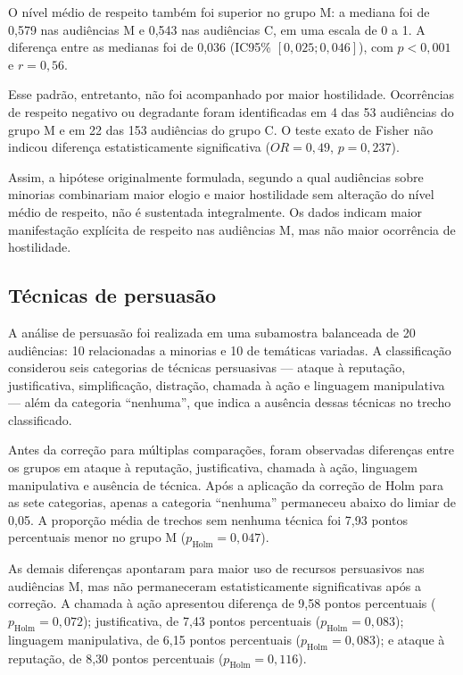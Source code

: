 O nível médio de respeito também foi superior no grupo M: a mediana foi de
0,579 nas audiências M e 0,543 nas audiências C, em uma escala de 0 a 1. A
diferença entre as medianas foi de 0,036 (IC95\% $[0{,}025;0{,}046]$), com
$p<0{,}001$ e $r=0{,}56$.

Esse padrão, entretanto, não foi acompanhado por maior hostilidade. Ocorrências
de respeito negativo ou degradante foram identificadas em 4 das 53 audiências
do grupo M e em 22 das 153 audiências do grupo C. O teste exato de Fisher não
indicou diferença estatisticamente significativa ($OR=0{,}49$, $p=0{,}237$).

Assim, a hipótese originalmente formulada, segundo a qual audiências sobre
minorias combinariam maior elogio e maior hostilidade sem alteração do nível
médio de respeito, não é sustentada integralmente. Os dados indicam maior
manifestação explícita de respeito nas audiências M, mas não maior ocorrência
de hostilidade.

\subsection{Técnicas de persuasão}

A análise de persuasão foi realizada em uma subamostra balanceada de 20
audiências: 10 relacionadas a minorias e 10 de temáticas variadas. A
classificação considerou seis categorias de técnicas persuasivas --- ataque à
reputação, justificativa, simplificação, distração, chamada à ação e linguagem
manipulativa --- além da categoria ``nenhuma'', que indica a ausência dessas
técnicas no trecho classificado.

Antes da correção para múltiplas comparações, foram observadas diferenças
entre os grupos em ataque à reputação, justificativa, chamada à ação, linguagem
manipulativa e ausência de técnica. Após a aplicação da correção de Holm para
as sete categorias, apenas a categoria ``nenhuma'' permaneceu abaixo do limiar
de 0,05. A proporção média de trechos sem nenhuma técnica foi 7,93 pontos
percentuais menor no grupo M ($p_{\mathrm{Holm}}=0{,}047$).

As demais diferenças apontaram para maior uso de recursos persuasivos nas
audiências M, mas não permaneceram estatisticamente significativas após a
correção. A chamada à ação apresentou diferença de 9,58 pontos percentuais
($p_{\mathrm{Holm}}=0{,}072$); justificativa, de 7,43 pontos percentuais
($p_{\mathrm{Holm}}=0{,}083$); linguagem manipulativa, de 6,15 pontos
percentuais ($p_{\mathrm{Holm}}=0{,}083$); e ataque à reputação, de 8,30
pontos percentuais ($p_{\mathrm{Holm}}=0{,}116$).

